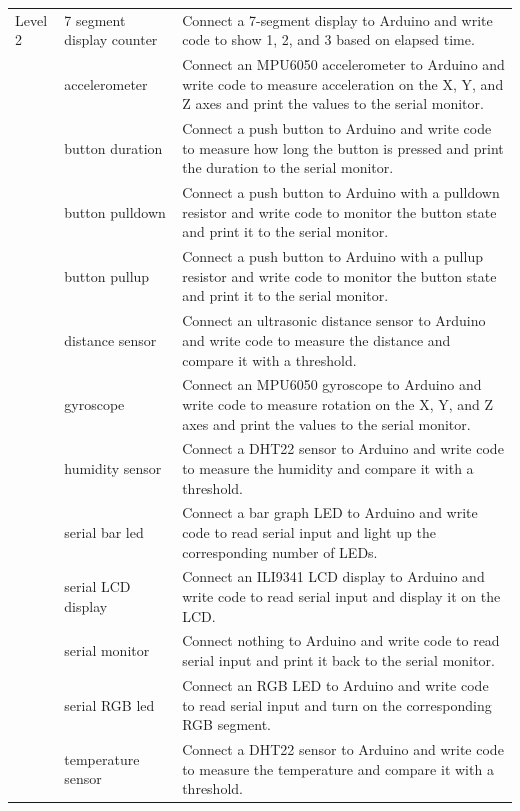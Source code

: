 \documentclass{article} %
\begin{document}
\begin{longtable}{@{}p{1.5cm}p{4cm}p{8.5cm}@{}}
Level 2 & 7 segment display counter & Connect a 7-segment display to Arduino and write code to show 1, 2, and 3 based on elapsed time. \\
& accelerometer & Connect an MPU6050 accelerometer to Arduino and write code to measure acceleration on the X, Y, and Z axes and print the values to the serial monitor. \\
& button duration & Connect a push button to Arduino and write code to measure how long the button is pressed and print the duration to the serial monitor. \\
& button pulldown & Connect a push button to Arduino with a pulldown resistor and write code to monitor the button state and print it to the serial monitor. \\
& button pullup & Connect a push button to Arduino with a pullup resistor and write code to monitor the button state and print it to the serial monitor. \\
& distance sensor & Connect an ultrasonic distance sensor to Arduino and write code to measure the distance and compare it with a threshold. \\
& gyroscope & Connect an MPU6050 gyroscope to Arduino and write code to measure rotation on the X, Y, and Z axes and print the values to the serial monitor. \\
& humidity sensor & Connect a DHT22 sensor to Arduino and write code to measure the humidity and compare it with a threshold. \\
& serial bar led & Connect a bar graph LED to Arduino and write code to read serial input and light up the corresponding number of LEDs. \\
& serial LCD display & Connect an ILI9341 LCD display to Arduino and write code to read serial input and display it on the LCD. \\
& serial monitor & Connect nothing to Arduino and write code to read serial input and print it back to the serial monitor. \\
& serial RGB led & Connect an RGB LED to Arduino and write code to read serial input and turn on the corresponding RGB segment. \\
& temperature sensor & Connect a DHT22 sensor to Arduino and write code to measure the temperature and compare it with a threshold. \\
\midrule


\end{longtable}
\end{document}
